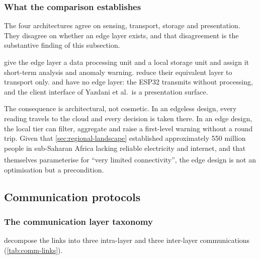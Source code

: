\documentclass[12pt,a4paper,oneside]{report}
\newcommand{\bq}[1]{``#1''\textsuperscript{\dag}}
\begin{document}
\subsubsection{What the comparison establishes}

The four architectures agree on sensing, transport, storage and presentation. They disagree on whether an edge layer exists, and that disagreement is the substantive finding of this subsection.

\Textcite{mucchi2021} give the edge layer a data processing unit and a local storage unit and assign it short-term analysis and anomaly warning. \Textcite{liu2025review} reduce their equivalent layer to transport only. \Textcite{efendi2025} and \textcite{yazdani2018} have no edge layer: the ESP32 transmits without processing, and the client interface of Yazdani et al.\ is a presentation surface.

The consequence is architectural, not cosmetic. In an edgeless design, every reading travels to the cloud and every decision is taken there. In an edge design, the local tier can filter, aggregate and raise a first-level warning without a round trip. Given that \cref{sec:regional-landscape} established approximately 550 million people in sub-Saharan Africa lacking reliable electricity and internet, and that \textcite{mucchi2021} themselves parameterise for \bq{very limited connectivity}, the edge design is not an optimisation but a precondition.

\subsection{Communication protocols}\label{sec:protocols-cloud}

\subsubsection{The communication layer taxonomy}

\Textcite{mucchi2021} decompose the links into three intra-layer and three inter-layer communications (\cref{tab:comm-links}).
\end{document}
